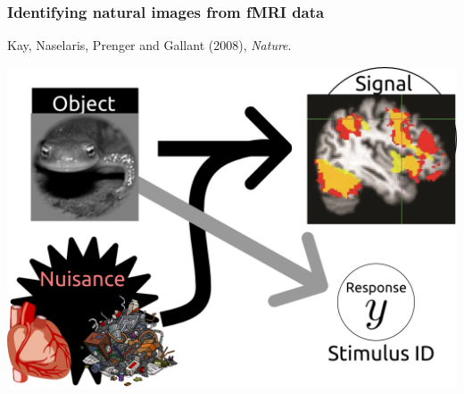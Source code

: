 \documentclass{beamer}
\begin{document}
\begin{frame}
\sectionpage
\end{frame}

\begin{frame}
\frametitle{Identifying natural images from fMRI data}
Kay, Naselaris, Prenger and Gallant (2008), \emph{Nature}.
\begin{center}
\includegraphics[scale = 0.25]{defense_diagrams/ident1.png}
\end{center}
\end{frame}
\end{document}
